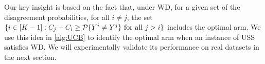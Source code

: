 %
Our key insight is based on the fact that,
under WD, for a given set of the disagreement probabilities, for all $i \neq j$, the set $\{i \in [K-1]: C_j - C_i \geq \P\{Y^i \neq Y^j\} \mbox{ for all } j>i\}$ includes the optimal arm. We use this idea in \cref{alg:UCB} to identify the optimal arm when an instance of USS satisfies WD. We will experimentally validate its performance on real datasets in the next section.

